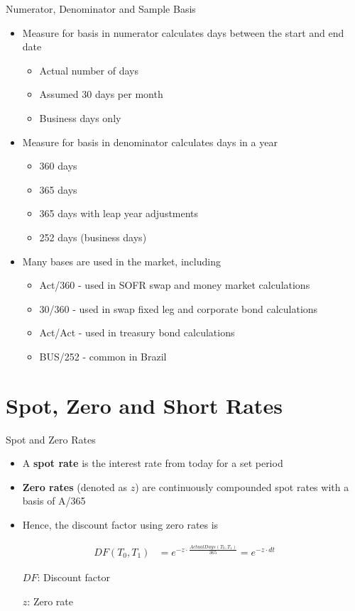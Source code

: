 \documentclass[handout, aspectratio=169]{beamer}
\begin{document}
\begin{frame}{Numerator, Denominator and Sample Basis}
	\pause
	\begin{itemize}
		\footnotesize
		\item Measure for basis in numerator calculates days between the start and end date
		\begin{itemize}
			\footnotesize
			\item Actual number of days
			\item Assumed 30 days per month
			\item Business days only
		\end{itemize}
		\item Measure for basis in denominator calculates days in a year
		\begin{itemize}
			\footnotesize
			\item 360 days
			\item 365 days
			\item 365 days with leap year adjustments
			\item 252 days (business days)
		\end{itemize}
		\item Many bases are used in the market, including
		\begin{itemize}
			\footnotesize
			\item Act/360 - used in SOFR swap and money market calculations
			\item 30/360 - used in swap fixed leg and corporate bond calculations
			\item Act/Act - used in treasury bond calculations
			\item BUS/252 - common in Brazil 
		\end{itemize}
	\end{itemize}
\end{frame}

\section{Spot, Zero and Short Rates}
\begin{frame}{Spot and Zero Rates}
	\pause
	\begin{itemize}
		\item A \textbf{spot rate} is the interest rate from today for a set period
		\item \textbf{Zero rates} (denoted as $z$) are continuously compounded spot rates with a basis of A/365 
		\item Hence, the discount factor using zero rates is
	\end{itemize}
	\begin{block}{}
		\begin{align*}
			DF(T_0,T_1) &= e^{-z \cdot \frac{ActualDays(T_0,T_1)}{365}} = e^{-z \cdot dt}
		\end{align*}
		\begin{itemize}
			\item[$DF$:] Discount factor
			\item[$z$:] Zero rate 
		\end{itemize}
	\end{block}
\end{frame}
\end{document}
